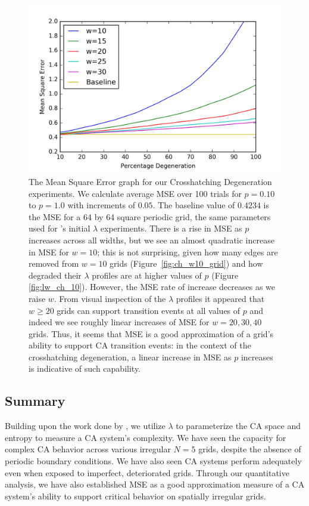 \documentclass[a4paper,11pt]{article}
\begin{document}
\begin{figure}[htp]
\centering
\includegraphics[width=\textwidth]{ch6_figs/ch_mse_10_30}
\caption[Mean Squared Error for Crosshatching Degeneration]{
  The Mean Square Error graph for our Crosshatching Degeneration experiments. We calculate average MSE over 100 trials for $p=0.10$ to $p=1.0$ with increments of $0.05$. The baseline value of $0.4234$ is the MSE for a 64 by 64 square periodic grid, the same parameters used for \citeauthor{wo90}'s initial $\lambda$ experiments. There is a rise in MSE as $p$ increases across all widths, but we see an almost quadratic increase in MSE for $w=10$; this is not surprising, given how many edges are removed from $w=10$ grids (Figure~\ref{fig:ch_w10_grid}) and how degraded their $\lambda$ profiles are at higher values of $p$ (Figure  \ref{fig:lw_ch_10}). However, the MSE rate of increase decreases as we raise $w$. From visual inspection of the $\lambda$ profiles it appeared that $w \ge 20$ grids can support transition events at all values of $p$ and indeed we see roughly linear increases of MSE for $w=20,30,40$ grids. Thus, it seems that MSE is a good approximation of a grid's ability to support CA transition events: in the context of the crosshatching degeneration, a linear increase in MSE as $p$ increases is indicative of such capability. 
}
\label{fig:ch_mse}
\end{figure}

\subsection{Summary}

Building upon the work done by \citeauthor{wo90}, we utilize $\lambda$ to parameterize the CA space and entropy to measure a CA system's complexity. We have seen the capacity for complex CA behavior across various irregular $N=5$ grids, despite the absence of periodic boundary conditions. We have also seen CA systems perform adequately even when exposed to imperfect, deteriorated grids. Through our quantitative analysis, we have also established MSE as a good approximation measure of a CA system's ability to support critical behavior on spatially irregular grids.
\end{document}

